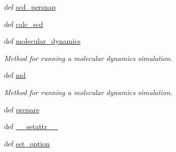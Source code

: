 \begin{DoxyCompactItemize}
\item 
def \hyperlink{classforcebalance_1_1gmxio_1_1GMX_a84a110849c5e078c0adb2d5df7b9db1a}{scd\-\_\-persnap}
\item 
def \hyperlink{classforcebalance_1_1gmxio_1_1GMX_a96c403f0363e40314647608225e0e6b2}{calc\-\_\-scd}
\item 
def \hyperlink{classforcebalance_1_1gmxio_1_1GMX_af442332b6a306fc22f95ca09d2c30d09}{molecular\-\_\-dynamics}
\begin{DoxyCompactList}\small\item\em Method for running a molecular dynamics simulation. \end{DoxyCompactList}\item 
def \hyperlink{classforcebalance_1_1gmxio_1_1GMX_a274816a13dc888aea5e2cd95c890f8b4}{md}
\begin{DoxyCompactList}\small\item\em Method for running a molecular dynamics simulation. \end{DoxyCompactList}\item 
def \hyperlink{classforcebalance_1_1engine_1_1Engine_a2eab57877002b41dc3742f0c67f2f24e}{prepare}
\item 
def \hyperlink{classforcebalance_1_1BaseClass_a0c851d413c3b2f30561b72a46771bcff}{\-\_\-\-\_\-setattr\-\_\-\-\_\-}
\item 
def \hyperlink{classforcebalance_1_1BaseClass_a73e9a37a7632e79eb99f49bd15aced45}{set\-\_\-option}
\end{DoxyCompactItemize}
